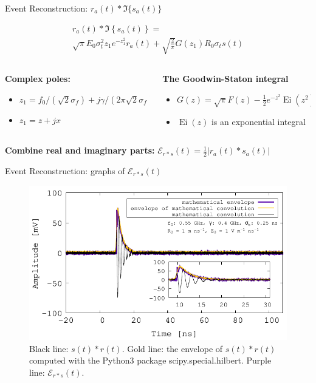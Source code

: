 \documentclass{beamer}
\DeclareMathOperator\Ei{Ei}
\begin{document}
\begin{frame}[fragile]{Event Reconstruction: $r_a(t) * \Im\lbrace s_a(t)\rbrace$}
\begin{tcolorbox}[colback=box_background,colframe=box_frame,title={Result for $r_a(t) * \Im\lbrace s_a(t)\rbrace$}]
\begin{multline}
r_a(t) * \Im\left\lbrace s_a(t) \right\rbrace = \\
\sqrt{\pi}E_0 \sigma_t^2 z_1 e^{-z_1^2}r_a(t) + \sqrt{\frac{2}{\pi}} G(z_1) R_0 \sigma_t s(t) \label{eq:Im_result}
\end{multline}
\end{tcolorbox}
\small
\begin{columns}[T]
\begin{column}{0.49\textwidth}
\textbf{Complex poles:}
\begin{itemize}
\item $z_1 = f_0/(\sqrt{2}\sigma_f) + j\gamma/(2\pi \sqrt{2} \sigma_f)$
\item $z_1 = z + jx$
\end{itemize}
\end{column}
\begin{column}{0.49\textwidth}
\textbf{The Goodwin-Staton integral}
\begin{itemize}
\item $G(z) = \sqrt{\pi}F(z) - \frac{1}{2}e^{-z^2}\Ei(z^2)$
\item $\Ei(z)$ is an exponential integral
\end{itemize}
\end{column}
\end{columns} \vspace{0.25cm}
\normalsize
\textbf{\alert{Combine real and imaginary parts:}} $\mathcal{E}_{r * s}(t) = \frac{1}{2}|r_a(t) * s_a(t)|$
\end{frame}

\begin{frame}[fragile]{Event Reconstruction: graphs of $\mathcal{E}_{r * s}(t)$}
\begin{figure}
\centering
\includegraphics[width=\textwidth]{March12_plot1.pdf}
\caption{\footnotesize \label{fig:fig1} Black line: $s(t) * r(t)$.  Gold line: the envelope of $s(t) * r(t)$ computed with the Python3 package scipy.special.hilbert. Purple line: $\mathcal{E}_{r * s}(t)$.}
\end{figure}
\end{frame}
\end{document}
